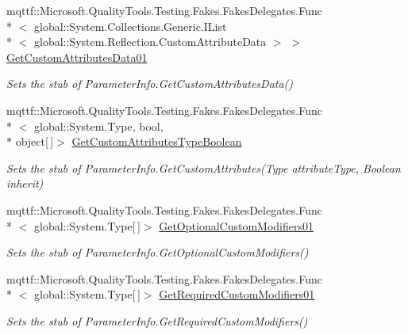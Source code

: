 \begin{DoxyCompactItemize}
mqttf\-::\-Microsoft.\-Quality\-Tools.\-Testing.\-Fakes.\-Fakes\-Delegates.\-Func\\*
$<$ global\-::\-System.\-Collections.\-Generic.\-I\-List\\*
$<$ global\-::\-System.\-Reflection.\-Custom\-Attribute\-Data $>$ $>$ \hyperlink{class_system_1_1_reflection_1_1_fakes_1_1_stub_parameter_info_ab895b9db92cbaaece20efacf5cc2f28f}{Get\-Custom\-Attributes\-Data01}
\begin{DoxyCompactList}\small\item\em Sets the stub of Parameter\-Info.\-Get\-Custom\-Attributes\-Data()\end{DoxyCompactList}\item 
mqttf\-::\-Microsoft.\-Quality\-Tools.\-Testing.\-Fakes.\-Fakes\-Delegates.\-Func\\*
$<$ global\-::\-System.\-Type, bool, \\*
object\mbox{[}$\,$\mbox{]}$>$ \hyperlink{class_system_1_1_reflection_1_1_fakes_1_1_stub_parameter_info_acbc607ef85e1cf19ed66989be904753f}{Get\-Custom\-Attributes\-Type\-Boolean}
\begin{DoxyCompactList}\small\item\em Sets the stub of Parameter\-Info.\-Get\-Custom\-Attributes(\-Type attribute\-Type, Boolean inherit)\end{DoxyCompactList}\item 
mqttf\-::\-Microsoft.\-Quality\-Tools.\-Testing.\-Fakes.\-Fakes\-Delegates.\-Func\\*
$<$ global\-::\-System.\-Type\mbox{[}$\,$\mbox{]}$>$ \hyperlink{class_system_1_1_reflection_1_1_fakes_1_1_stub_parameter_info_a3efa788fc3d7f08da9edea48f1d15f0a}{Get\-Optional\-Custom\-Modifiers01}
\begin{DoxyCompactList}\small\item\em Sets the stub of Parameter\-Info.\-Get\-Optional\-Custom\-Modifiers()\end{DoxyCompactList}\item 
mqttf\-::\-Microsoft.\-Quality\-Tools.\-Testing.\-Fakes.\-Fakes\-Delegates.\-Func\\*
$<$ global\-::\-System.\-Type\mbox{[}$\,$\mbox{]}$>$ \hyperlink{class_system_1_1_reflection_1_1_fakes_1_1_stub_parameter_info_aa87fcd631076bfcf031736c2fff6287f}{Get\-Required\-Custom\-Modifiers01}
\begin{DoxyCompactList}\small\item\em Sets the stub of Parameter\-Info.\-Get\-Required\-Custom\-Modifiers()\end{DoxyCompactList}\item 

\end{DoxyCompactItemize}
